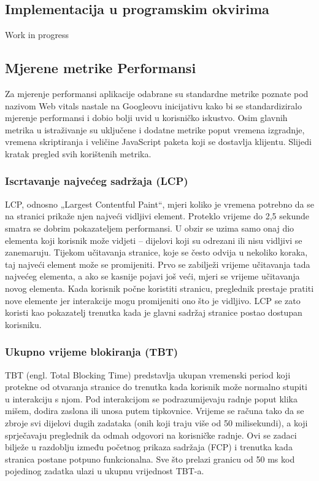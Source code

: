 \subsection{Implementacija u programskim okvirima}
Work in progress

\subsection{Mjerene metrike Performansi}

Za mjerenje performansi aplikacije odabrane su standardne metrike poznate pod nazivom Web vitals nastale na Googleovu inicijativu kako bi se standardiziralo mjerenje performansi i dobio bolji uvid u korisničko iskustvo. Osim glavnih metrika u istraživanje su uključene i dodatne metrike poput vremena izgradnje, vremena skriptiranja i veličine JavaScript paketa koji se dostavlja klijentu. Slijedi kratak pregled svih korištenih metrika.

\subsubsection{Iscrtavanje najvećeg sadržaja (LCP)}

LCP, odnosno „Largest Contentful Paint“, mjeri koliko je vremena potrebno da se na stranici prikaže njen najveći vidljivi element. Proteklo vrijeme do 2,5 sekunde smatra se dobrim pokazateljem performansi. U obzir se uzima samo onaj dio elementa koji korisnik može vidjeti – dijelovi koji su odrezani ili nisu vidljivi se zanemaruju. Tijekom učitavanja stranice, koje se često odvija u nekoliko koraka, taj najveći element može se promijeniti. Prvo se zabilježi vrijeme učitavanja tada najvećeg elementa, a ako se kasnije pojavi još veći, mjeri se vrijeme učitavanja novog elementa. Kada korisnik počne koristiti stranicu, preglednik prestaje pratiti nove elemente jer interakcije mogu promijeniti ono što je vidljivo. LCP se zato koristi kao pokazatelj trenutka kada je glavni sadržaj stranice postao dostupan korisniku. \cite{nordstrom2023comparison}

\subsubsection{Ukupno vrijeme blokiranja (TBT)}

TBT (engl. Total Blocking Time) predstavlja ukupan vremenski period koji protekne od otvaranja stranice do trenutka kada korisnik može normalno stupiti u interakciju s njom. Pod interakcijom se podrazumijevaju radnje poput klika mišem, dodira zaslona ili unosa putem tipkovnice. Vrijeme se računa tako da se zbroje svi dijelovi dugih zadataka (onih koji traju više od 50 milisekundi), a koji sprječavaju preglednik da odmah odgovori na korisničke radnje. Ovi se zadaci bilježe u razdoblju između početnog prikaza sadržaja (FCP) i trenutka kada stranica postane potpuno funkcionalna. Sve što prelazi granicu od 50 ms kod pojedinog zadatka ulazi u ukupnu vrijednost TBT-a. \cite{nordstrom2023comparison}

